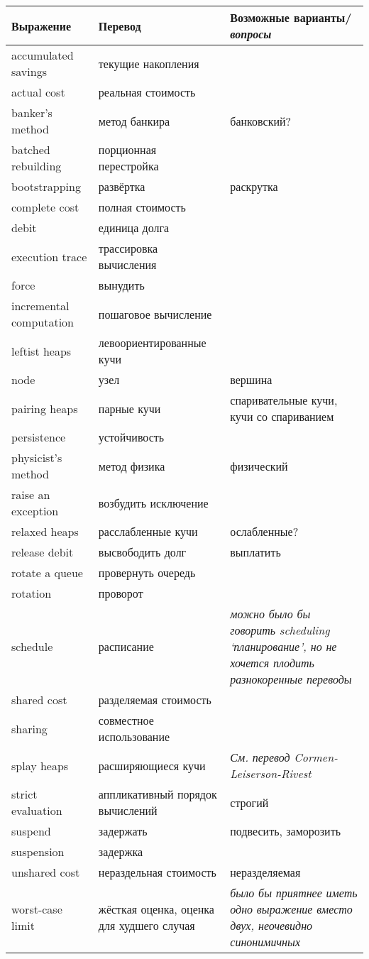 \documentclass{article}
\begin{document}
\begin{tabular}{p{3cm}|p{4cm}|p{5cm}}
Выражение & Перевод & Возможные варианты/\textit{вопросы} \\
\hline
accumulated savings & текущие накопления \\
actual cost & реальная стоимость \\
banker's method & метод банкира & банковский? \\
batched rebuilding & порционная перестройка \\
bootstrapping & развёртка & раскрутка \\
complete cost & полная стоимость \\
debit & единица долга \\
execution trace & трассировка вычисления \\
force & вынудить \\
incremental computation & пошаговое вычисление \\
leftist heaps & левоориентированные кучи \\
node & узел & вершина \\
pairing heaps & парные кучи & спаривательные кучи, кучи со спариванием \\
persistence & устойчивость \\
physicist's method & метод физика & физический \\
raise an exception & возбудить исключение \\
relaxed heaps & расслабленные кучи & ослабленные? \\
release debit & высвободить долг & выплатить \\
rotate a queue & провернуть очередь \\
rotation & проворот \\
schedule & расписание & \textit{можно было бы говорить
  \emph{scheduling} `планирование', но не хочется плодить
  разнокоренные переводы} \\
shared cost & разделяемая стоимость \\
sharing & совместное использование \\
splay heaps & расширяющиеся кучи & \textit{См. перевод Cormen-Leiserson-Rivest}\\
strict evaluation & аппликативный порядок вычислений & строгий \\
suspend & задержать & подвесить, заморозить \\
suspension & задержка \\
unshared cost & нераздельная стоимость & неразделяемая \\
worst-case limit & жёсткая оценка, оценка для худшего случая &
\textit{было бы приятнее иметь одно выражение вместо двух, неочевидно
  синонимичных} \\
  
\end{tabular}
\end{document}
